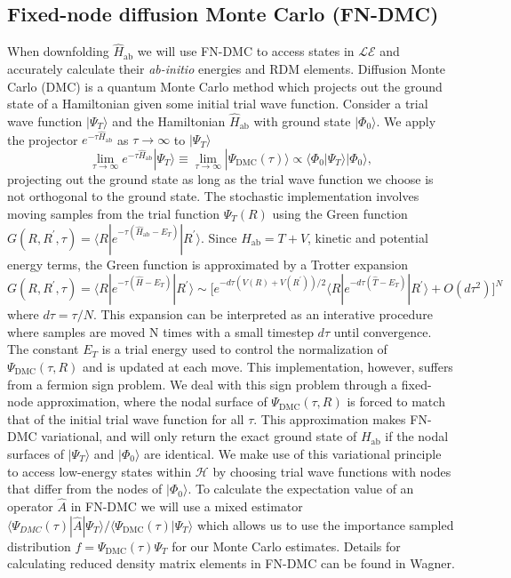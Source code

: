 \documentclass{article}
\begin{document}
\subsection{Fixed-node diffusion Monte Carlo (FN-DMC)}
When downfolding $\hat{H}_\text{ab}$ we will use FN-DMC to access states in $\mathcal{LE}$ and accurately calculate their \textit{ab-initio} energies and RDM elements.
Diffusion Monte Carlo (DMC) is a quantum Monte Carlo method which projects out the ground state of a Hamiltonian given some initial trial wave function.
Consider a trial wave function $|\Psi_T\rangle$ and the Hamiltonian $\hat{H}_\text{ab}$ with ground state $|\Phi_0\rangle$. We apply the projector $e^{-\tau \hat{H}_\text{ab}}$ as $\tau \rightarrow \infty$ to $|\Psi_T \rangle$
\begin{equation}
\lim_{\tau \rightarrow \infty} e^{-\tau \hat{H}_\text{ab}} |\Psi_T\rangle 
\equiv \lim_{\tau \rightarrow \infty} |\Psi_\text{DMC}(\tau)\rangle \propto \langle \Phi_0|\Psi_T\rangle |\Phi_0\rangle,
\end{equation}
projecting out the ground state as long as the trial wave function we choose is not orthogonal to the ground state. 
The stochastic implementation involves moving samples from the trial function $\Psi_T(R)$ using the Green function $G(R, R^\prime, \tau) = \langle R | e^{-\tau(\hat{H}_\text{ab} - E_T)} | R^\prime \rangle$. Since $H_\text{ab} = T + V$, kinetic and potential energy terms, the Green function is approximated by a Trotter expansion $G(R, R^\prime, \tau) = \langle R | e^{-\tau(\hat{H} - E_T)} | R^\prime \rangle \sim \Big[e^{-d\tau(V(R) + V(R^\prime))/2} \langle R| e^{-d\tau(\hat{T} - E_T)}|R^\prime \rangle + O(d\tau^2) \Big]^N $ where $d\tau = \tau/N$.
This expansion can be interpreted as an interative procedure where samples are moved N times with a small timestep $d\tau$ until convergence.
The constant $E_T$ is a trial energy used to control the normalization of $\Psi_\text{DMC}(\tau, R)$ and is updated at each move.
This implementation, however, suffers from a fermion sign problem. 
We deal with this sign problem through a fixed-node approximation, where the nodal surface of $\Psi_\text{DMC}(\tau, R)$ is forced to match that of the initial trial wave function for all $\tau$.
This approximation makes FN-DMC variational, and will only return the exact ground state of $H_\text{ab}$ if the nodal surfaces of $|\Psi_T\rangle$ and $|\Phi_0\rangle$ are identical.
We make use of this variational principle to access low-energy states within $\mathcal{H}$ by choosing trial wave functions with nodes that differ from the nodes of $|\Phi_0 \rangle$.
To calculate the expectation value of an operator $\hat{A}$ in FN-DMC we will use a mixed estimator $\langle \Psi_{DMC}(\tau) |\hat{A} | \Psi_T \rangle/\langle \Psi_\text{DMC}(\tau) | \Psi_T \rangle$ which allows us to use the importance sampled distribution $f = \Psi_\text{DMC}(\tau)\Psi_T$ for our Monte Carlo estimates.
Details for calculating reduced density matrix elements in FN-DMC can be found in Wagner.
\end{document}
